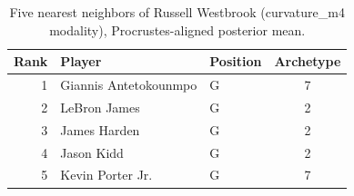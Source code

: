 \begin{table}[htbp]
  \centering\small
  \begin{tabular}{rllc}
    \toprule
    Rank & Player & Position & Archetype \\
    \midrule
    1 & Giannis Antetokounmpo & G & 7 \\
    2 & LeBron James & G & 2 \\
    3 & James Harden & G & 2 \\
    4 & Jason Kidd & G & 2 \\
    5 & Kevin Porter Jr. & G & 7 \\
    \bottomrule
  \end{tabular}
  \caption{Five nearest neighbors of Russell Westbrook (curvature_m4 modality), Procrustes-aligned posterior mean.}
  \label{tab:Russell_Westbrook_neighbors_curvature_m4}
\end{table}

